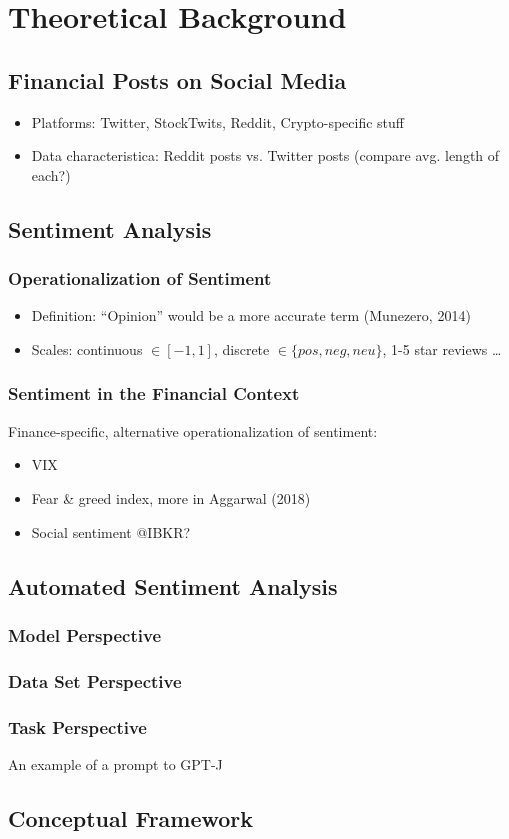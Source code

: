 \section{Theoretical Background}

\subsection{Financial Posts on Social Media}
\begin{itemize}[noitemsep]
	\item Platforms: Twitter, StockTwits, Reddit, Crypto-specific stuff
	\item Data characteristica: Reddit posts vs. Twitter posts (compare avg. length of each?)
\end{itemize}


\subsection{Sentiment Analysis}  %
\subsubsection{Operationalization of Sentiment}
\begin{itemize}
	\item Definition: ``Opinion'' would be a more accurate term (Munezero, 2014)
	\item Scales: continuous $\in [-1, 1]$, discrete $\in \{pos, neg, neu\}$, 1-5 star reviews \dots
\end{itemize}
\subsubsection{Sentiment in the Financial Context}

Finance-specific, alternative operationalization of sentiment:
\begin{itemize}[noitemsep]
	\item VIX
	\item Fear \& greed index, more in Aggarwal (2018)
	\item Social sentiment @IBKR?
	
\end{itemize}

\subsection{Automated Sentiment Analysis}
\subsubsection{Model Perspective}
\subsubsection{Data Set Perspective}
\subsubsection{Task Perspective}



An example of a prompt to GPT-J \cite{gpt-j}




\subsection{Conceptual Framework}
